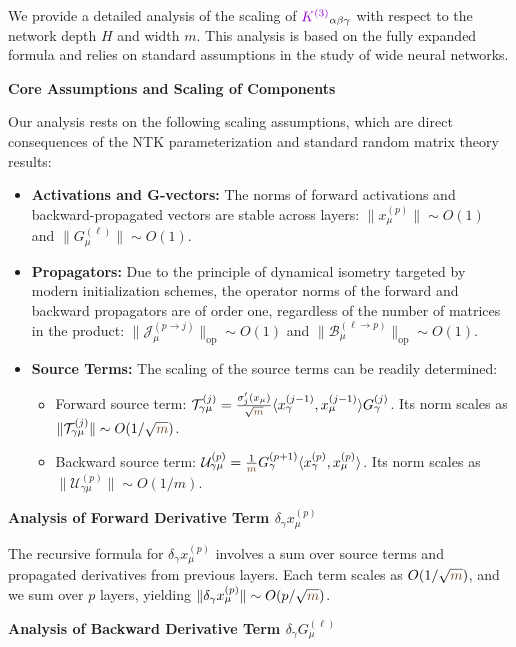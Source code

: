 \documentclass[a4paper]{article}
\newcommand{\m}{\textcolor{weightcolor}{m}}
\theoremstyle{plain}
\theoremstyle{definition}
\theoremstyle{remark}
\begin{document}
We provide a detailed analysis of the scaling of $\textcolor{k3color}{K^{(3)}}_{\alpha\beta\gamma}$ with respect to the network depth $H$ and width $m$. This analysis is based on the fully expanded formula and relies on standard assumptions in the study of wide neural networks.

\textbf{Core Assumptions and Scaling of Components}

Our analysis rests on the following scaling assumptions, which are direct consequences of the NTK parameterization and standard random matrix theory results:
\begin{itemize}
    \item \textbf{Activations and G-vectors:} The norms of forward activations and backward-propagated vectors are stable across layers: $\|x^{(p)}_\mu\| \sim O(1)$ and $\|G^{(\ell)}_\mu\| \sim O(1)$.
    \item \textbf{Propagators:} Due to the principle of dynamical isometry targeted by modern initialization schemes, the operator norms of the forward and backward propagators are of order one, regardless of the number of matrices in the product: $\|\mathcal{J}^{(p \to j)}_\mu\|_{\text{op}} \sim O(1)$ and $\|\mathcal{B}^{(\ell \to p)}_\mu\|_{\text{op}} \sim O(1)$.
    \item \textbf{Source Terms:} The scaling of the source terms can be readily determined:
    \begin{itemize}
        \item Forward source term: $\mathcal{T}^{(j)}_{\gamma\mu} = \frac{\sigma'_{j}(x_\mu)}{\sqrt{\m}} \langle x^{(j-1)}_\gamma, x^{(j-1)}_\mu \rangle G^{(j)}_\gamma$. Its norm scales as $\|\mathcal{T}^{(j)}_{\gamma\mu}\| \sim O(1/\sqrt{\m})$.
        \item Backward source term: $\mathcal{U}^{(p)}_{\gamma\mu} = \frac{1}{\m} G^{(p+1)}_\gamma \langle x^{(p)}_\gamma, x^{(p)}_\mu \rangle$. Its norm scales as $\|\mathcal{U}^{(p)}_{\gamma\mu}\| \sim O(1/m)$.
    \end{itemize}
\end{itemize}

\textbf{Analysis of Forward Derivative Term $\delta_\gamma x^{(p)}_\mu$}

The recursive formula for $\delta_\gamma x^{(p)}_\mu$ involves a sum over source terms and propagated derivatives from previous layers. Each term scales as $O(1/\sqrt{\m})$, and we sum over $p$ layers, yielding $\|\delta_\gamma x^{(p)}_\mu\| \sim O(p/\sqrt{\m})$.

\textbf{Analysis of Backward Derivative Term $\delta_\gamma G^{(\ell)}_\mu$}
\end{document}
